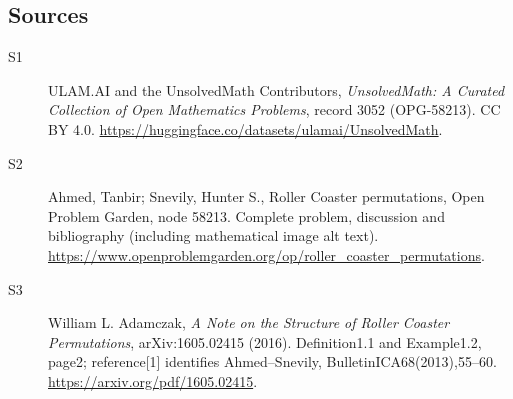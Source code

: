 \documentclass[11pt]{book}
\begin{document}
\subsection{Sources}
\begin{description}
\item[\hypertarget{source:3052:1}{S1}] ULAM.AI and the UnsolvedMath Contributors, \emph{UnsolvedMath: A Curated Collection of Open Mathematics Problems}, record 3052 (OPG-58213). CC BY 4.0. \url{https://huggingface.co/datasets/ulamai/UnsolvedMath}.
\item[\hypertarget{source:3052:2}{S2}] Ahmed, Tanbir; Snevily, Hunter S., Roller Coaster permutations, Open Problem Garden, node 58213. Complete problem, discussion and bibliography (including mathematical image alt text). \url{https://www.openproblemgarden.org/op/roller_coaster_permutations}.
\item[\hypertarget{source:3052:3}{S3}] William L. Adamczak, \emph{A Note on the Structure of Roller Coaster Permutations}, arXiv:1605.02415 (2016). Definition1.1 and Example1.2, page2; reference[1] identifies Ahmed--Snevily, BulletinICA68(2013),55--60. \url{https://arxiv.org/pdf/1605.02415}.
\end{description}
\label{end:3052}
\end{document}
